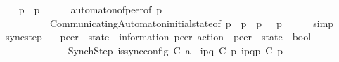 \begin{isabellebody}
\ \ \isamarkupfalse%
\ {\isachardoublequoteopen}{\isasymC}\isactrlsub {\isasymI}\isactrlsub {\isasymzero}{\isacharparenleft}{\kern0pt}p{\isacharparenright}{\kern0pt}\ {\isasymin}\ {\isasymS}{\isacharparenleft}{\kern0pt}p{\isacharparenright}{\kern0pt}{\isachardoublequoteclose}\isanewline
\ \ \ \ \isamarkupfalse%
\ automaton{\isacharunderscore}{\kern0pt}of{\isacharunderscore}{\kern0pt}peer{\isacharbrackleft}{\kern0pt}of\ p{\isacharbrackright}{\kern0pt}\isanewline
\ \ \ \ \ \ \ \ \ \ CommunicatingAutomaton{\isachardot}{\kern0pt}initial{\isacharunderscore}{\kern0pt}state{\isacharbrackleft}{\kern0pt}of\ p\ {\isachardoublequoteopen}{\isasymS}\ p{\isachardoublequoteclose}\ {\isachardoublequoteopen}{\isasymC}\isactrlsub {\isasymI}\isactrlsub {\isasymzero}\ p{\isachardoublequoteclose}\ {\isasymM}\ {\isachardoublequoteopen}{\isasymR}\ p{\isachardoublequoteclose}{\isacharbrackright}{\kern0pt}\isanewline
\ \ \ \ \isamarkupfalse%
\ simp\isanewline
{}\isamarkupfalse%
%
\endisatagproof
{\isafoldproof}%
%
\isadelimproof
\isanewline
%
\endisadelimproof
\isanewline
{}\isamarkupfalse%
\ sync{\isacharunderscore}{\kern0pt}step\isanewline
\ \ {\isacharcolon}{\kern0pt}{\isacharcolon}{\kern0pt}\ {\isachardoublequoteopen}{\isacharparenleft}{\kern0pt}{\isacharprime}{\kern0pt}peer\ {\isasymRightarrow}\ {\isacharprime}{\kern0pt}state{\isacharparenright}{\kern0pt}\ {\isasymRightarrow}\ {\isacharparenleft}{\kern0pt}{\isacharprime}{\kern0pt}information{\isacharcomma}{\kern0pt}\ {\isacharprime}{\kern0pt}peer{\isacharparenright}{\kern0pt}\ action\ {\isasymRightarrow}\ {\isacharparenleft}{\kern0pt}{\isacharprime}{\kern0pt}peer\ {\isasymRightarrow}\ {\isacharprime}{\kern0pt}state{\isacharparenright}{\kern0pt}\ {\isasymRightarrow}\ bool{\isachardoublequoteclose}\isanewline
\ \ \ \ \ {\isacharparenleft}{\kern0pt}{\isachardoublequoteopen}{\isacharunderscore}{\kern0pt}\ {\isasymmidarrow}{\isasymlangle}{\isacharunderscore}{\kern0pt}{\isacharcomma}{\kern0pt}\ {\isasymzero}{\isasymrangle}{\isasymrightarrow}\ {\isacharunderscore}{\kern0pt}{\isachardoublequoteclose}\ {\isacharbrackleft}{\kern0pt}{}{}{\isacharcomma}{\kern0pt}\ {}{}{\isacharcomma}{\kern0pt}\ {}{}{\isacharbrackright}{\kern0pt}\ {}{}{}{\isacharparenright}{\kern0pt}\ \isanewline
SynchStep{\isacharcolon}{\kern0pt}\ {\isachardoublequoteopen}{\isasymlbrakk}is{\isacharunderscore}{\kern0pt}sync{\isacharunderscore}{\kern0pt}config\ C{}{\isacharsemicolon}{\kern0pt}\ a\ {\isacharequal}{\kern0pt}\ {\isacharbang}{\kern0pt}{\isasymlangle}{\isacharparenleft}{\kern0pt}i\isactrlbsup p{\isasymrightarrow}q\isactrlesup {\isacharparenright}{\kern0pt}{\isasymrangle}{\isacharsemicolon}{\kern0pt}\ C{}\ p\ {\isasymmidarrow}{\isacharbang}{\kern0pt}{\isasymlangle}{\isacharparenleft}{\kern0pt}i\isactrlbsup p{\isasymrightarrow}q\isactrlesup {\isacharparenright}{\kern0pt}{\isasymrangle}{\isasymrightarrow}p\ {\isacharparenleft}{\kern0pt}C{}\ p{\isacharparenright}{\kern0pt}{\isacharsemicolon}{\kern0pt}\isanewline

\end{isabellebody}
